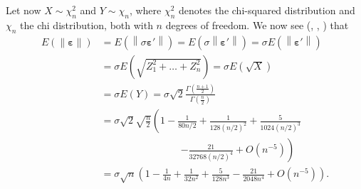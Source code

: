 \documentclass[12pt,a4]{article}
\newcommand{\lnorm}{\left\|}
\newcommand{\rnorm}{\right\|}
\newcommand{\eps}{\ensuremath{\varepsilon}}
\newcommand{\vc}[1]{\ensuremath{\bm{#1}}}
\begin{document}
Let now $X \sim \chi_n^2$ and $Y \sim \chi_n$, where $\chi_n^2$ denotes the chi-squared distribution and $\chi_n$ the chi distribution, both with $n$ degrees of freedom. We now see (\cite{handbook}, \cite{chi}, \cite{mathworld}) that
\begin{equation}
\label{eq:calc}
\begin{alignedat}{1}
E\left(\lnorm \vc{\eps} \rnorm \right)   &= E\left(\lnorm \sigma \vc{\eps'} \rnorm \right)   =
E\left(\sigma \lnorm \vc{\eps'} \rnorm \right) = \sigma E\left(\lnorm \vc{\eps'} \rnorm \right) \\
&= \sigma E\left(\sqrt{Z_1^2 + \ldots + Z_n^2} \right) = \sigma E\left(\sqrt{X} \right) \\
&= \sigma E\left( Y \right) = 
\sigma \sqrt{2}\frac{\Gamma\left(\frac{n+1}{2}\right)}{\Gamma\left(\frac{n}{2}\right)} \\
&= \sigma \sqrt{2} \sqrt{\frac{n}{2}} \left( 1 - \frac{1}{80 n/2} + \frac{1}{128 (n/2)^2} + \frac{5}{1024 (n/2)^3} \right. \\ & \qquad \qquad \qquad \qquad \left. - \frac{21}{32768 (n/2)^4} + O\left( n^{-5} \right) \right) \\
&= \sigma \sqrt{n} \left( 1 - \frac{1}{4 n} + \frac{1}{32 n^2} + \frac{5}{128 n^3} - \frac{21}{2048 n^4} + O\left( n^{-5} \right) \right) .
\end{alignedat}
\end{equation}
\end{document}

